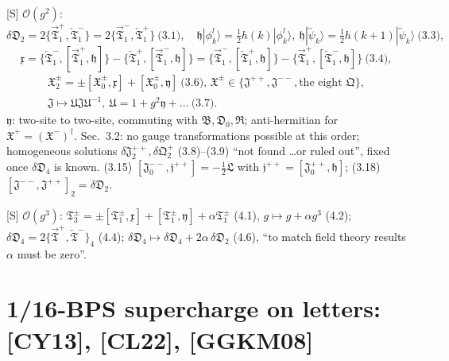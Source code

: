 \documentclass[10pt]{article}
\begin{document}
[S] $\mathcal O(g^2)$:
\begin{equation*}
\delta\mathfrak D_2=2\{\overrightarrow{\mathfrak T}^+_1,\overleftarrow{\mathfrak T}^-_1\}=2\{\overrightarrow{\mathfrak T}^-_1,\overleftarrow{\mathfrak T}^+_1\}\ \text{(3.1)},\quad \mathfrak h|\phi^l_k\rangle=\tfrac12h(k)|\phi^l_k\rangle,\ \mathfrak h|\overleftrightarrow\psi_k\rangle=\tfrac12h(k+1)|\overleftrightarrow\psi_k\rangle\ \text{(3.3)},
\end{equation*}
\begin{equation*}
\mathfrak x=\{\overleftarrow{\mathfrak T}^-_1,[\overrightarrow{\mathfrak T}^+_1,\mathfrak h]\}-\{\overleftarrow{\mathfrak T}^+_1,[\overrightarrow{\mathfrak T}^-_1,\mathfrak h]\}=\{\overrightarrow{\mathfrak T}^-_1,[\overleftarrow{\mathfrak T}^+_1,\mathfrak h]\}-\{\overrightarrow{\mathfrak T}^+_1,[\overleftarrow{\mathfrak T}^-_1,\mathfrak h]\}\ \text{(3.4)},
\end{equation*}
\begin{gather*}
\mathfrak X^\pm_2=\pm[\mathfrak X^\pm_0,\mathfrak x]+[\mathfrak X^\pm_0,\mathfrak y]\ \text{(3.6), $\mathfrak X^\pm\in\{\mathfrak J^{++},\mathfrak J^{--},\text{the eight }\mathfrak Q\}$},\\ \mathfrak J\mapsto\mathfrak U\mathfrak J\mathfrak U^{-1},\ \mathfrak U=1+g^2\mathfrak y+\dots\ \text{(3.7)}.
\end{gather*}
$\mathfrak y$: two-site to two-site, commuting with $\mathfrak B,\mathfrak D_0,\mathfrak R$; anti-hermitian for $\mathfrak X^+=(\mathfrak X^-)^\dagger$. Sec.\ 3.2: no gauge transformations possible at this order; homogeneous solutions $\delta\mathfrak J^{++}_2,\delta\mathfrak Q^{+}_2$ (3.8)--(3.9) ``not found \dots or ruled out'', fixed once $\delta\mathfrak D_4$ is known. (3.15) $[\mathfrak J^{--}_0,\mathfrak j^{++}]=-\frac12\mathfrak L$ with $\mathfrak j^{++}=[\mathfrak J^{++}_0,\mathfrak h]$; (3.18) $[\mathfrak J^{--},\mathfrak J^{++}]_2=\delta\mathfrak D_2$.

[S] $\mathcal O(g^3)$: $\mathfrak T^\pm_3=\pm[\mathfrak T^\pm_1,\mathfrak x]+[\mathfrak T^\pm_1,\mathfrak y]+\alpha\mathfrak T^\pm_1$ (4.1), $g\mapsto g+\alpha g^3$ (4.2); $\delta\mathfrak D_4=2\{\overrightarrow{\mathfrak T}^+,\overleftarrow{\mathfrak T}^-\}_4$ (4.4); $\delta\mathfrak D_4\mapsto\delta\mathfrak D_4+2\alpha\,\delta\mathfrak D_2$ (4.6), ``to match field theory results $\alpha$ must be zero''.

\section{1/16-BPS supercharge on letters: [CY13], [CL22], [GGKM08]}
\end{document}
